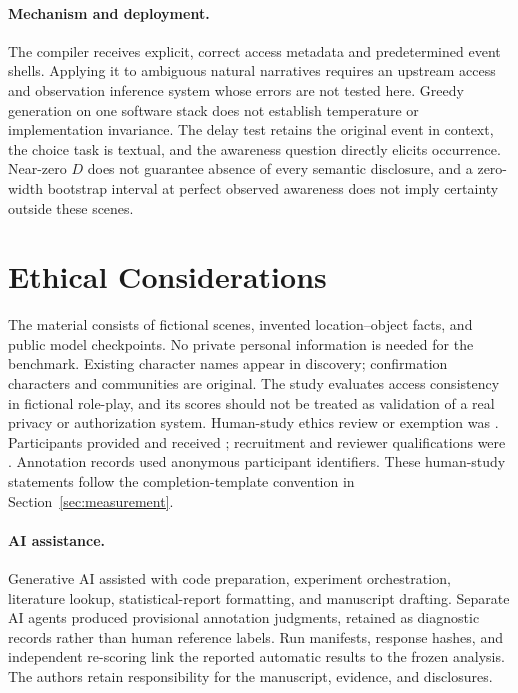 \paragraph{Mechanism and deployment.}
The compiler receives explicit, correct access metadata and predetermined event shells. Applying it to ambiguous natural narratives requires an upstream access and observation inference system whose errors are not tested here. Greedy generation on one software stack does not establish temperature or implementation invariance. The delay test retains the original event in context, the choice task is textual, and the awareness question directly elicits occurrence. Near-zero $D$ does not guarantee absence of every semantic disclosure, and a zero-width bootstrap interval at perfect observed awareness does not imply certainty outside these scenes.

\section*{Ethical Considerations}
The material consists of fictional scenes, invented location--object facts, and public model checkpoints. No private personal information is needed for the benchmark. Existing character names appear in discovery; confirmation characters and communities are original. The study evaluates access consistency in fictional role-play, and its scores should not be treated as validation of a real privacy or authorization system. Human-study ethics review or exemption was . Participants provided  and received ; recruitment and reviewer qualifications were . Annotation records used anonymous participant identifiers. These human-study statements follow the completion-template convention in Section~\ref{sec:measurement}.

\paragraph{AI assistance.}
Generative AI assisted with code preparation, experiment orchestration, literature lookup, statistical-report formatting, and manuscript drafting. Separate AI agents produced provisional annotation judgments, retained as diagnostic records rather than human reference labels. Run manifests, response hashes, and independent re-scoring link the reported automatic results to the frozen analysis. The authors retain responsibility for the manuscript, evidence, and disclosures.

